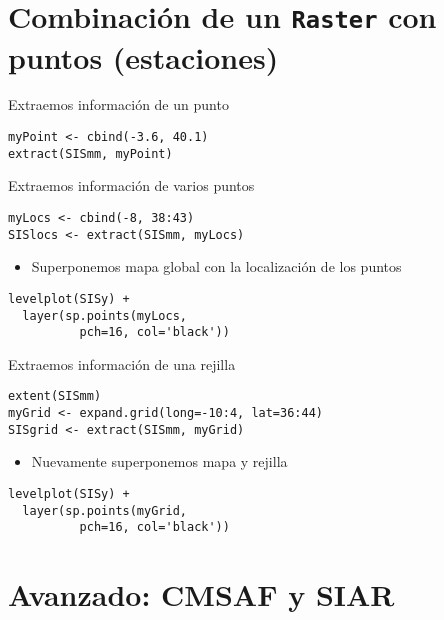 \documentclass[xcolor={usenames,svgnames,dvipsnames}]{beamer}
\begin{document}
\section{Combinación de un \texttt{Raster} con puntos (estaciones)}
\label{sec-3}

\begin{frame}[fragile,label=sec-3-1]{Extraemos información de un punto}
 \lstset{language=R,numbers=none}
\begin{lstlisting}
myPoint <- cbind(-3.6, 40.1)
extract(SISmm, myPoint)
\end{lstlisting}
\end{frame}

\begin{frame}[fragile,label=sec-3-2]{Extraemos información de varios puntos}
 \lstset{language=R,numbers=none}
\begin{lstlisting}
myLocs <- cbind(-8, 38:43)
SISlocs <- extract(SISmm, myLocs)
\end{lstlisting}
\begin{itemize}
\item Superponemos mapa global con la localización de los puntos
\end{itemize}
\lstset{language=R,numbers=none}
\begin{lstlisting}
levelplot(SISy) +
  layer(sp.points(myLocs,
		  pch=16, col='black'))
\end{lstlisting}
\end{frame}

\begin{frame}[fragile,label=sec-3-3]{Extraemos información de una rejilla}
 \lstset{language=R,numbers=none}
\begin{lstlisting}
extent(SISmm)
myGrid <- expand.grid(long=-10:4, lat=36:44)
SISgrid <- extract(SISmm, myGrid)
\end{lstlisting}
\begin{itemize}
\item Nuevamente superponemos mapa y rejilla
\end{itemize}
\lstset{language=R,numbers=none}
\begin{lstlisting}
levelplot(SISy) +
  layer(sp.points(myGrid,
		  pch=16, col='black'))
\end{lstlisting}
\end{frame}

\section{Avanzado: CMSAF y SIAR}
\label{sec-4}
\end{document}
